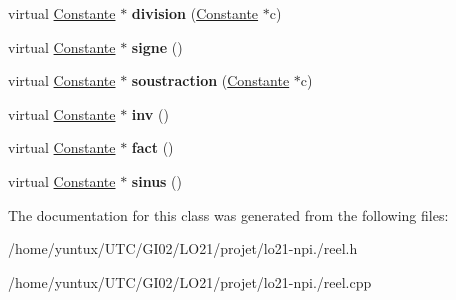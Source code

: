 \begin{DoxyCompactItemize}
\item 
\hypertarget{class_reel_af82effc61166bcc5f2ed9d0a2c97bee1}{virtual \hyperlink{class_constante}{\-Constante} $\ast$ {\bfseries division} (\hyperlink{class_constante}{\-Constante} $\ast$c)}\label{class_reel_af82effc61166bcc5f2ed9d0a2c97bee1}

\item 
\hypertarget{class_reel_aec5959f07be6fdce8e87d58c1fa97a59}{virtual \hyperlink{class_constante}{\-Constante} $\ast$ {\bfseries signe} ()}\label{class_reel_aec5959f07be6fdce8e87d58c1fa97a59}

\item 
\hypertarget{class_reel_a3c53208d46d2139790598fc5a7f29b7d}{virtual \hyperlink{class_constante}{\-Constante} $\ast$ {\bfseries soustraction} (\hyperlink{class_constante}{\-Constante} $\ast$c)}\label{class_reel_a3c53208d46d2139790598fc5a7f29b7d}

\item 
\hypertarget{class_reel_ac2388aae44a03e17a80efaf322583784}{virtual \hyperlink{class_constante}{\-Constante} $\ast$ {\bfseries inv} ()}\label{class_reel_ac2388aae44a03e17a80efaf322583784}

\item 
\hypertarget{class_reel_a93cccda34883afa19ea08f9e84a6d22e}{virtual \hyperlink{class_constante}{\-Constante} $\ast$ {\bfseries fact} ()}\label{class_reel_a93cccda34883afa19ea08f9e84a6d22e}

\item 
\hypertarget{class_reel_a8e943954e7d3c46031b3e2e59b2f1717}{virtual \hyperlink{class_constante}{\-Constante} $\ast$ {\bfseries sinus} ()}\label{class_reel_a8e943954e7d3c46031b3e2e59b2f1717}

\end{DoxyCompactItemize}


\-The documentation for this class was generated from the following files\-:\begin{DoxyCompactItemize}
\item 
/home/yuntux/\-U\-T\-C/\-G\-I02/\-L\-O21/projet/lo21-\/npi./reel.\-h\item 
/home/yuntux/\-U\-T\-C/\-G\-I02/\-L\-O21/projet/lo21-\/npi./reel.\-cpp\end{DoxyCompactItemize}
